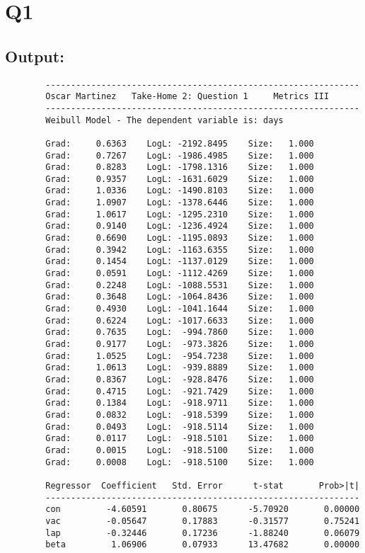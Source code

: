 \documentclass[12pt]{article}
\begin{document}
	
	\section*{Q1}
	\subsection*{Output:}
	\begin{verbatim}
		--------------------------------------------------------------
		Oscar Martinez 	 Take-Home 2: Question 1 	 Metrics III
		--------------------------------------------------------------
		Weibull Model - The dependent variable is: days
		
		Grad:     0.6363    LogL: -2192.8495    Size:   1.000
		Grad:     0.7267    LogL: -1986.4985    Size:   1.000
		Grad:     0.8283    LogL: -1798.1316    Size:   1.000
		Grad:     0.9357    LogL: -1631.6029    Size:   1.000
		Grad:     1.0336    LogL: -1490.8103    Size:   1.000
		Grad:     1.0907    LogL: -1378.6446    Size:   1.000
		Grad:     1.0617    LogL: -1295.2310    Size:   1.000
		Grad:     0.9140    LogL: -1236.4924    Size:   1.000
		Grad:     0.6690    LogL: -1195.0893    Size:   1.000
		Grad:     0.3942    LogL: -1163.6355    Size:   1.000
		Grad:     0.1454    LogL: -1137.0129    Size:   1.000
		Grad:     0.0591    LogL: -1112.4269    Size:   1.000
		Grad:     0.2248    LogL: -1088.5531    Size:   1.000
		Grad:     0.3648    LogL: -1064.8436    Size:   1.000
		Grad:     0.4930    LogL: -1041.1644    Size:   1.000
		Grad:     0.6224    LogL: -1017.6633    Size:   1.000
		Grad:     0.7635    LogL:  -994.7860    Size:   1.000
		Grad:     0.9177    LogL:  -973.3826    Size:   1.000
		Grad:     1.0525    LogL:  -954.7238    Size:   1.000
		Grad:     1.0613    LogL:  -939.8889    Size:   1.000
		Grad:     0.8367    LogL:  -928.8476    Size:   1.000
		Grad:     0.4715    LogL:  -921.7429    Size:   1.000
		Grad:     0.1384    LogL:  -918.9711    Size:   1.000
		Grad:     0.0832    LogL:  -918.5399    Size:   1.000
		Grad:     0.0493    LogL:  -918.5114    Size:   1.000
		Grad:     0.0117    LogL:  -918.5101    Size:   1.000
		Grad:     0.0015    LogL:  -918.5100    Size:   1.000
		Grad:     0.0008    LogL:  -918.5100    Size:   1.000
		
		Regressor  Coefficient	 Std. Error 	 t-stat       Prob>|t|
		--------------------------------------------------------------
		con         -4.60591       0.80675      -5.70920       0.00000 
		vac         -0.05647       0.17883      -0.31577       0.75241 
		lap         -0.32446       0.17236      -1.88240       0.06079 
		beta         1.06906       0.07933      13.47682       0.00000 
	\end{verbatim}
\end{document}
